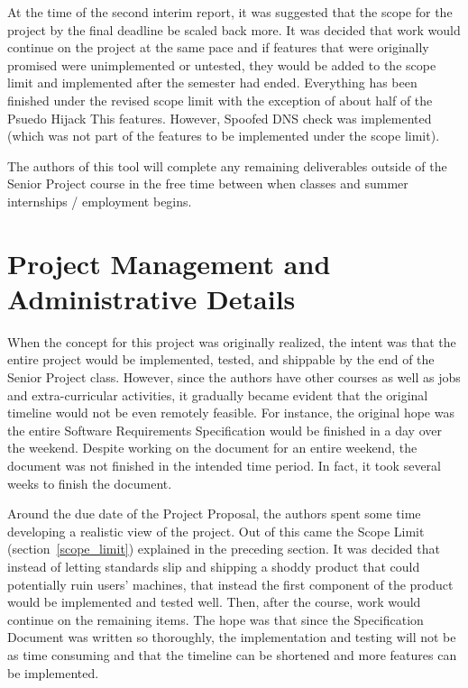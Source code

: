 \documentclass[letterpaper,12pt]{article}
\begin{document}
At the time of the second interim report, it was suggested that the scope for
the project by the final deadline be scaled back more.  It was decided that work
would continue on the project at the same pace and if features that were
originally promised were unimplemented or untested, they would be added to the
scope limit and implemented after the semester had ended.  Everything has been
finished under the revised scope limit with the exception of about half of the
Psuedo Hijack This features.  However, Spoofed DNS check was implemented (which
was not part of the features to be implemented under the scope limit).

The authors of this tool will complete any remaining deliverables outside of the
Senior Project course in the free time between when classes and summer
internships / employment begins.  

\newpage



\section{Project Management and Administrative Details}
\label{project_management} 
When the concept for this project was originally realized, the intent was that
the entire project would be implemented, tested, and shippable by the end of the
Senior Project class.  However, since the authors have other courses as well as
jobs and extra-curricular activities, it gradually became evident that the
original timeline would not be even remotely feasible.  For instance, the
original hope was the entire Software Requirements Specification
\cite{Specification} would be finished in a day over the weekend.  Despite
working on the document for an entire weekend, the document was not finished in
the intended time period.  In fact, it took several weeks to finish the
document.  

Around the due date of the Project Proposal, the authors spent some time
developing a realistic view of the project.  Out of this came the Scope Limit
(section~\ref{scope_limit}) explained in the preceding section.  It was decided
that instead of letting standards slip and shipping a shoddy product that could
potentially ruin users' machines, that instead the first component of the
product would be implemented and tested well.  Then, after the course, work
would continue on the remaining items.  The hope was that since the
Specification Document was written so thoroughly, the implementation and testing
will not be as time consuming and that the timeline can be shortened and more
features can be implemented.
\end{document}
